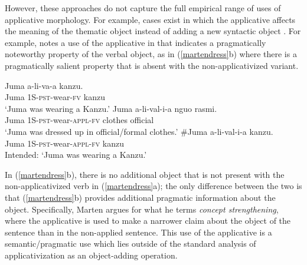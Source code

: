 \documentclass[output=paper]{langsci/langscibook}
\begin{document}
However, these approaches do not capture the full empirical range of uses of applicative morphology. For example, cases exist in which the applicative affects the meaning of the thematic object instead of adding a new syntactic object \citep{Marten2003, creissels:2004, CannMabugu2007, bond:2009}. For example, \citet{Marten2003} notes a use of the applicative in  that indicates a pragmatically noteworthy property of the verbal object, as in (\ref{martendress}b) where there is a pragmatically salient property that is absent with the non-applicativized variant.

\begin{exe}
\ex\label{martendress} \begin{xlist}
	\ex \gll Juma a-li-va-a kanzu.\\
Juma 1S-{\scshape pst}-wear-{\scshape fv} kanzu\\
	\glt `Juma was wearing a Kanzu.'
	\ex\gll Juma a-li-val-i-a nguo rasmi.\\
Juma {\scshape 1S-pst}-wear-{\scshape appl-fv} clothes official\\
	\glt `Juma was dressed up in official/formal clothes.'
	\ex\gll \#Juma a-li-val-i-a kanzu.\\
Juma {\scshape 1S-pst}-wear-{\scshape appl-fv} kanzu\\
	\glt Intended: `Juma was wearing a Kanzu.' \citep[9]{Marten2003} %
	\end{xlist}
\end{exe}
%
In (\ref{martendress}b), there is no additional object that is not present with the non-applicativized verb in (\ref{martendress}a); the only difference between the two is that (\ref{martendress}b) provides additional pragmatic information about the object. Specifically, Marten argues for what he terms \emph{concept strengthening}, where the applicative is used to make a narrower claim about the object of the sentence than in the non-applied sentence. This use of the applicative is a semantic/pragmatic use which lies outside of the standard analysis of applicativization as an object-adding operation. 
\end{document}
